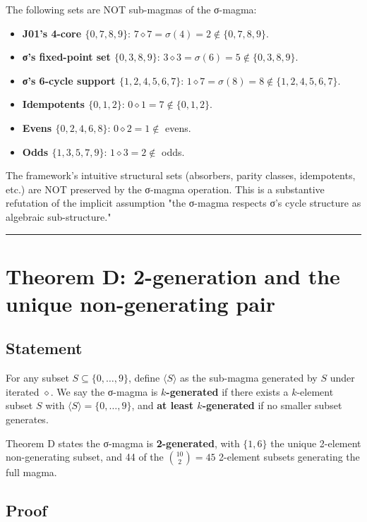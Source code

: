 \documentclass[11pt,reqno]{amsart}
\theoremstyle{plain}
\theoremstyle{definition}
\begin{document}
The following sets are NOT sub-magmas of the σ-magma:

\begin{itemize}
\item \textbf{J01's 4-core $\{0, 7, 8, 9\}$}: $7 \diamond 7 = \sigma(4) = 2 \notin \{0, 7, 8, 9\}$.
\item \textbf{σ's fixed-point set $\{0, 3, 8, 9\}$}: $3 \diamond 3 = \sigma(6) = 5 \notin \{0, 3, 8, 9\}$.
\item \textbf{σ's 6-cycle support $\{1, 2, 4, 5, 6, 7\}$}: $1 \diamond 7 = \sigma(8) = 8 \notin \{1, 2, 4, 5, 6, 7\}$.
\item \textbf{Idempotents $\{0, 1, 2\}$}: $0 \diamond 1 = 7 \notin \{0, 1, 2\}$.
\item \textbf{Evens $\{0, 2, 4, 6, 8\}$}: $0 \diamond 2 = 1 \notin$ evens.
\item \textbf{Odds $\{1, 3, 5, 7, 9\}$}: $1 \diamond 3 = 2 \notin$ odds.
\end{itemize}

The framework's intuitive structural sets (absorbers, parity classes, idempotents, etc.) are NOT preserved by the σ-magma operation. This is a substantive refutation of the implicit assumption "the σ-magma respects σ's cycle structure as algebraic sub-structure."

\medskip\hrule\medskip

\section{Theorem D: 2-generation and the unique non-generating pair}

\subsection{Statement}

For any subset $S \subseteq \{0, \ldots, 9\}$, define $\langle S \rangle$ as the sub-magma generated by $S$ under iterated $\diamond$. We say the σ-magma is \textbf{$k$-generated} if there exists a $k$-element subset $S$ with $\langle S \rangle = \{0, \ldots, 9\}$, and \textbf{at least $k$-generated} if no smaller subset generates.

Theorem D states the σ-magma is \textbf{2-generated}, with $\{1, 6\}$ the unique 2-element non-generating subset, and 44 of the $\binom{10}{2} = 45$ 2-element subsets generating the full magma.

\subsection{Proof}
\end{document}
